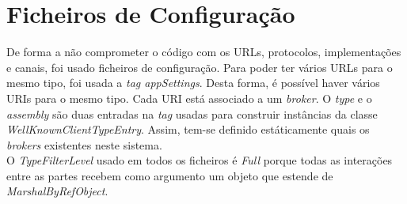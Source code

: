 \section{Ficheiros de Configuração} \label{configuracao}

De forma a não comprometer o código com os URLs, protocolos, implementações e canais, foi usado ficheiros de configuração. 
Para poder ter vários URLs para o mesmo tipo, foi usada a \textit{tag appSettings}. Desta forma, é possível haver vários URIs para o mesmo tipo. Cada URI está associado a um \textit{broker}. O \textit{type} e o \textit{assembly} são duas entradas na \textit{tag} usadas para construir instâncias da classe \textit{WellKnownClientTypeEntry}. Assim, tem-se definido estáticamente quais os \textit{brokers} existentes neste sistema.\\

O \textit{TypeFilterLevel} usado em todos os ficheiros é \textit{Full} porque todas as interações entre as partes recebem como argumento um objeto que estende de \textit{MarshalByRefObject}.
